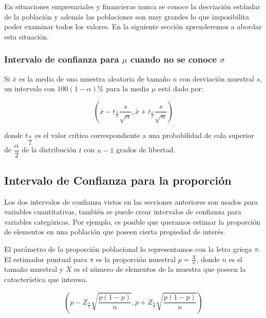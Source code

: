 \documentclass[letterpaper,]{book}
\begin{document}
En situaciones empresariales y financieras nunca se conoce la desviación estándar de la población y además las poblaciones son muy grandes lo que imposibilita poder examinar todos los valores. En la siguiente sección aprenderemos a abordar esta situación.

\hypertarget{icsd}{%
\subsubsection{\texorpdfstring{Intervalo de confianza para \(\mu\) cuando no se conoce \(\sigma\)}{Intervalo de confianza para \textbackslash{}mu cuando no se conoce \textbackslash{}sigma}}\label{icsd}}

Si \(\bar{x}\) es la media de una muestra aleatoria de tamaño \(n\) con desviación muestral \(s\), un intervalo con \(100\left(1-\alpha\right)\%\) para la media \(\mu\) está dado por:

\begin{equation} 
  \left(\bar{x} - t_{\frac{\alpha}{2}}\dfrac{s}{\sqrt{n}}, \bar{x} + t_{\frac{\alpha}{2}}\dfrac{s}{\sqrt{n}}  \right)
  \label{eq:icmusd}
\end{equation}

donde \(t_{\dfrac{\alpha}{2}}\) es el valor crítico correspondiente a una probabilidad de cola superior de \(\dfrac{\alpha}{2}\) de la distribución \(t\) con \(n-1\) grados de libertad.

\hypertarget{intervalo-de-confianza-para-la-proporcion}{%
\subsection{Intervalo de Confianza para la proporción}\label{intervalo-de-confianza-para-la-proporcion}}

Los dos intervalos de confianza vistos en las secciones anteriores son usados para variables cuantitativas, también se puede crear intervalos de confianza para variables categóricas. Por ejemplo, es posible que queramos estimar la proporción de elementos en una población que poseen cierta propiedad de interés.

El parámetro de la proporción poblacional lo representamos con la letra griega \(\pi\). El estimador puntual para \(\pi\) es la proporción muestral \(p=\frac{X}{n}\), donde \(n\) es el tamaño muestral y \(X\) es el número de elementos de la muestra que poseen la catacterística que interesa.

\begin{equation} 
  \left(p - Z_{\frac{\alpha}{2}}\sqrt{\dfrac{p\left(1-p\right)}{n}}, p + Z_{\frac{\alpha}{2}}\sqrt{\dfrac{p\left(1-p\right)}{n}}  \right)
  \label{eq:icprop}
\end{equation}
\end{document}
